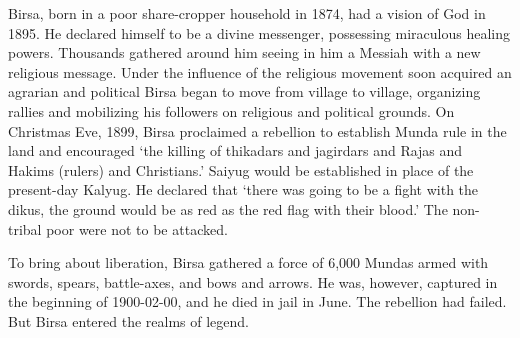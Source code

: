 Birsa, born in a poor share-cropper household in 1874, had a vision of God in 1895. He declared himself to be a divine messenger, possessing miraculous healing powers. Thousands gathered around him seeing in him a Messiah with a new religious message. Under the influence of the religious movement soon acquired an agrarian and political Birsa began to move from village to village, organizing rallies and mobilizing his followers on religious and political grounds. On Christmas Eve, 1899, Birsa proclaimed a rebellion to establish Munda rule in the land and encouraged `the killing of thikadars and jagirdars and Rajas and Hakims (rulers) and Christians.' Saiyug would be established in place of the present-day Kalyug. He declared that `there was going to be a fight with the dikus, the ground would be as red as the red flag with their blood.' The non-tribal poor were not to be attacked.

To bring about liberation, Birsa gathered a force of 6,000 Mundas armed with swords, spears, battle-axes, and bows and arrows. He was, however, captured in the beginning of 1900-02-00, and he died in jail in June. The rebellion had failed. But Birsa entered the realms of legend.

